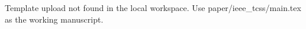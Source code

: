 \documentclass[lettersize,journal]{IEEEtran}
\begin{document}
Template upload not found in the local workspace. Use paper/ieee_tcss/main.tex as the working manuscript.
\end{document}
